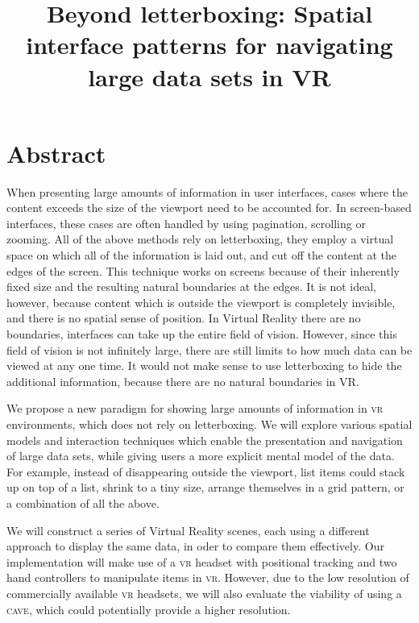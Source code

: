 



\title{Beyond letterboxing: Spatial interface patterns for navigating large data sets in VR}\maketitle

\section{Abstract}
When presenting large amounts of information in user interfaces, cases where the content exceeds the size of the viewport need to be accounted for. In screen-based interfaces, these cases are often handled by using pagination, scrolling or zooming. All of the above methods rely on letterboxing, \ie they employ a virtual space on which all of the information is laid out, and cut off the content at the edges of the screen. This technique works on screens because of their inherently fixed size and the resulting natural boundaries at the edges. It is not ideal, however, because content which is outside the viewport is completely invisible, and there is no spatial sense of position. In Virtual Reality there are no boundaries, interfaces can take up the entire field of vision. However, since this field of vision is not infinitely large, there are still limits to how much data can be viewed at any one time. It would not make sense to use letterboxing to hide the additional information, because there are no natural boundaries in VR.

We propose a new paradigm for showing large amounts of information in \textsc{vr} environments, which does not rely on letterboxing. We will explore various spatial models and interaction techniques which enable the presentation and navigation of large data sets, while giving users a more explicit mental model of the data. For example, instead of disappearing outside the viewport, list items could stack up on top of a list, shrink to a tiny size, arrange themselves in a grid pattern, or a combination of all the above.

We will construct a series of Virtual Reality scenes, each using a different approach to display the same data, in oder to compare them effectively. Our implementation will make use of a \textsc{vr} headset with positional tracking and two hand controllers to manipulate items in \textsc{vr}. However, due to the low resolution of commercially available \textsc{vr} headsets, we will also evaluate the viability of using a \textsc{cave}, which could potentially provide a higher resolution.

